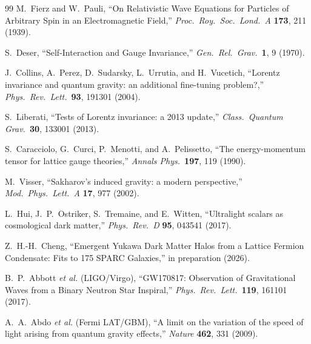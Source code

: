 \documentclass[11pt,a4paper]{article}
\begin{document}
\begin{thebibliography}{99}
M.~Fierz and W.~Pauli,
``On Relativistic Wave Equations for Particles of Arbitrary Spin
in an Electromagnetic Field,''
\textit{Proc.\ Roy.\ Soc.\ Lond.\ A} \textbf{173}, 211 (1939).

S.~Deser,
``Self-Interaction and Gauge Invariance,''
\textit{Gen.\ Rel.\ Grav.}\ \textbf{1}, 9 (1970).

J.~Collins, A.~Perez, D.~Sudarsky, L.~Urrutia, and H.~Vucetich,
``Lorentz invariance and quantum gravity: an additional
fine-tuning problem?,''
\textit{Phys.\ Rev.\ Lett.}\ \textbf{93}, 191301 (2004).

S.~Liberati,
``Tests of Lorentz invariance: a 2013 update,''
\textit{Class.\ Quantum Grav.}\ \textbf{30}, 133001 (2013).

S.~Caracciolo, G.~Curci, P.~Menotti, and A.~Pelissetto,
``The energy-momentum tensor for lattice gauge theories,''
\textit{Annals Phys.}\ \textbf{197}, 119 (1990).

M.~Visser,
``Sakharov's induced gravity: a modern perspective,''
\textit{Mod.\ Phys.\ Lett.\ A} \textbf{17}, 977 (2002).

L.~Hui, J.~P.~Ostriker, S.~Tremaine, and E.~Witten,
``Ultralight scalars as cosmological dark matter,''
\textit{Phys.\ Rev.\ D} \textbf{95}, 043541 (2017).

Z.~H.-H.~Cheng,
``Emergent Yukawa Dark Matter Halos from a Lattice Fermion
Condensate: Fits to 175 SPARC Galaxies,''
in preparation (2026).

B.~P.~Abbott \textit{et al.} (LIGO/Virgo),
``GW170817: Observation of Gravitational Waves from a Binary
Neutron Star Inspiral,''
\textit{Phys.\ Rev.\ Lett.}\ \textbf{119}, 161101 (2017).

A.~A.~Abdo \textit{et al.} (Fermi LAT/GBM),
``A limit on the variation of the speed of light arising from
quantum gravity effects,''
\textit{Nature} \textbf{462}, 331 (2009).

\end{thebibliography}
\end{document}
